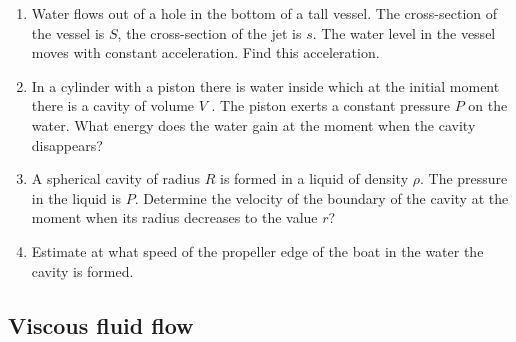 \documentclass{article}
\begin{document}
\begin{enumerate}[label=4.3.\arabic*]
\item Water flows out of a hole in the bottom of a tall vessel. The cross-section of the vessel is $S$, the cross-section of the jet is $s$. The water level in the vessel moves with constant acceleration. Find this acceleration.

\item In a cylinder with a piston there is water inside which at the initial moment there is a cavity of volume $V$ . The piston exerts a constant pressure $P$ on the water. What energy does the water gain at the moment when the cavity disappears?

\item A spherical cavity of radius $R$ is formed in a liquid of density $\rho$. The pressure in the liquid is $P$. Determine the velocity of the boundary of the cavity at the moment when its radius decreases to the value $r$?

\item Estimate at what speed of the propeller edge of the boat in the water the cavity is formed.



\end{enumerate}

\subsection{Viscous fluid flow}
\end{document}
